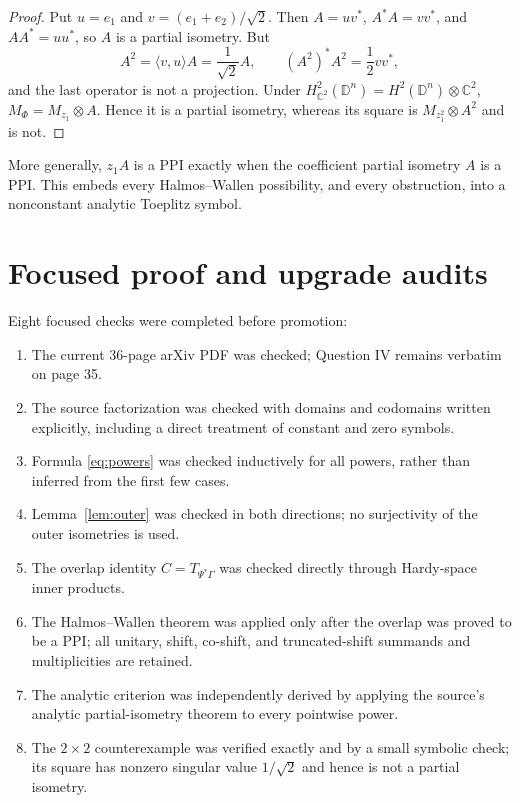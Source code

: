 \documentclass[11pt]{article}
\newcommand{\D}{\mathbb D}
\begin{document}
\begin{proof}
Put $u=e_1$ and $v=(e_1+e_2)/\sqrt2$.  Then $A=uv^*$,
$A^*A=vv^*$, and $AA^*=uu^*$, so $A$ is a partial isometry.  But
\[
 A^2=\langle v,u\rangle A=\frac1{\sqrt2}A,
 \qquad (A^2)^*A^2=\frac12 vv^*,
\]
and the last operator is not a projection.  Under
$H^2_{\mathbb C^2}(\D^n)=H^2(\D^n)\otimes\mathbb C^2$,
$M_\Phi=M_{z_1}\otimes A$.  Hence it is a partial isometry, whereas its
square is $M_{z_1^2}\otimes A^2$ and is not.
\end{proof}

More generally, $z_1A$ is a PPI exactly when the coefficient partial
isometry $A$ is a PPI.  This embeds every Halmos--Wallen possibility, and
every obstruction, into a nonconstant analytic Toeplitz symbol.

\section{Focused proof and upgrade audits}

Eight focused checks were completed before promotion:
\begin{enumerate}
\item The current 36-page arXiv PDF was checked; Question IV remains verbatim
on page 35.
\item The source factorization was checked with domains and codomains written
explicitly, including a direct treatment of constant and zero symbols.
\item Formula \eqref{eq:powers} was checked inductively for all powers, rather
than inferred from the first few cases.
\item Lemma~\ref{lem:outer} was checked in both directions; no surjectivity of
the outer isometries is used.
\item The overlap identity $C=T_{\Psi^*\Gamma}$ was checked directly through
Hardy-space inner products.
\item The Halmos--Wallen theorem was applied only after the overlap was proved
to be a PPI; all unitary, shift, co-shift, and truncated-shift summands and
multiplicities are retained.
\item The analytic criterion was independently derived by applying the
source's analytic partial-isometry theorem to every pointwise power.
\item The $2\times2$ counterexample was verified exactly and by a small
symbolic check; its square has nonzero singular value $1/\sqrt2$ and hence is
not a partial isometry.
\end{enumerate}
\end{document}
